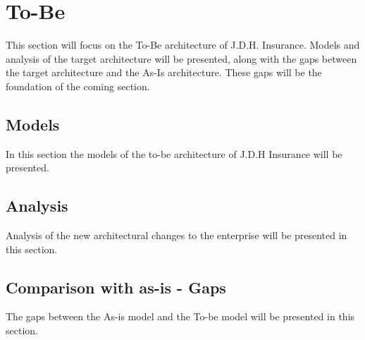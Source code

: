 \section{To-Be}
\label{sec:to_be}
This section will focus on the To-Be architecture of J.D.H. Insurance. Models and analysis of the target architecture will be presented, along with the gaps between the target architecture and the As-Is architecture. These gaps will be the foundation of the coming section.
%
\subsection{Models}
\label{sec:models}
In this section the models of the to-be architecture of J.D.H Insurance will be presented.
%
\subsection{Analysis}
\label{sec:analysis}
Analysis of the new architectural changes to the enterprise will be presented in this section.
%
\subsection{Comparison with as-is - Gaps}
\label{sec:gaps}
The gaps between the As-is model and the To-be model will be presented in this section.






